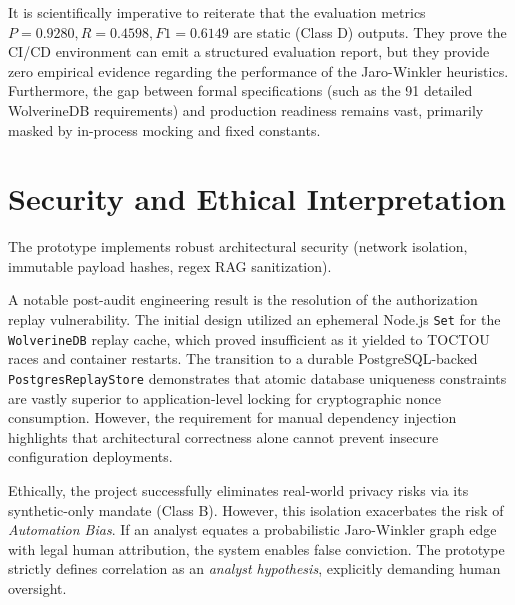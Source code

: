 It is scientifically imperative to reiterate that the evaluation metrics $P=0.9280, R=0.4598, F1=0.6149$ are static (Class D) outputs. They prove the CI/CD environment can emit a structured evaluation report, but they provide zero empirical evidence regarding the performance of the Jaro-Winkler heuristics. Furthermore, the gap between formal specifications (such as the 91 detailed WolverineDB requirements) and production readiness remains vast, primarily masked by in-process mocking and fixed constants.

\section{Security and Ethical Interpretation}
\label{sec:disc-security-ethics}
The prototype implements robust architectural security (network isolation, immutable payload hashes, regex RAG sanitization). 

A notable post-audit engineering result is the resolution of the authorization replay vulnerability. The initial design utilized an ephemeral Node.js \texttt{Set} for the \texttt{WolverineDB} replay cache, which proved insufficient as it yielded to TOCTOU races and container restarts. The transition to a durable PostgreSQL-backed \texttt{PostgresReplayStore} demonstrates that atomic database uniqueness constraints are vastly superior to application-level locking for cryptographic nonce consumption. However, the requirement for manual dependency injection highlights that architectural correctness alone cannot prevent insecure configuration deployments.

Ethically, the project successfully eliminates real-world privacy risks via its synthetic-only mandate (Class B). However, this isolation exacerbates the risk of \textit{Automation Bias}. If an analyst equates a probabilistic Jaro-Winkler graph edge with legal human attribution, the system enables false conviction. The prototype strictly defines correlation as an \textit{analyst hypothesis}, explicitly demanding human oversight.

